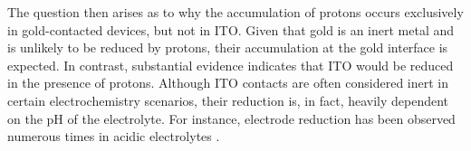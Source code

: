 

\noindent The question then arises as to why the accumulation of protons occurs exclusively in gold-contacted devices, but not in ITO. Given that gold is an inert metal and is unlikely to be reduced by protons, their accumulation at the gold interface is expected. In contrast, substantial evidence indicates that ITO would be reduced in the presence of protons. Although ITO contacts are often considered inert in certain electrochemistry scenarios, their reduction is, in fact, heavily dependent on the pH of the electrolyte. For instance, electrode reduction has been observed numerous times in acidic electrolytes \cite{ciocci2021differentiating, senthilkumar2008electrochemical}.\\



